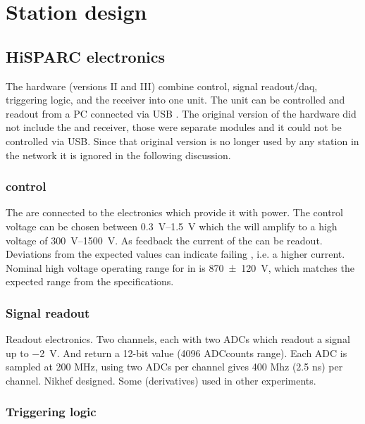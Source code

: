 \section{Station design}

\subsection{HiSPARC electronics}

The \hisparc hardware (versions II and III) combine \pmt control, signal
readout/daq, triggering logic, and the \gps receiver into one unit. The
unit can be controlled and readout from a PC connected via USB
\cite{messages}. The original version of the \hisparc hardware did not
include the \daq and \gps receiver, those were separate modules and it
could not be controlled via USB. Since that original version is no
longer used by any station in the network it is ignored in the following
discussion.


\subsubsection{\pmt control}

The \pmts are connected to the \hisparc electronics which provide it with power. The control voltage can be chosen between \SIrange{.3}{1.5}{\volt} which the \pmt will amplify to a high voltage of \SIrange{300}{1500}{\volt}. As feedback the current of the \pmt can be readout. Deviations from the expected values can indicate failing \pmts, i.e. a higher current. Nominal high voltage operating range for \pmts in \hisparc is \SI{870\pm120}{\volt}, which matches the expected range from the \pmt specifications.


\subsubsection{Signal readout}

Readout electronics. Two channels, each with two ADCs which readout a
signal up to \SI{-2}{\volt}. And return a 12-bit value (4096 ADCcounts
range). Each ADC is sampled at 200 MHz, using two ADCs per channel gives
400 Mhz (2.5 ns) per channel. Nikhef designed. Some (derivatives) used
in other experiments.


\subsubsection{Triggering logic}

